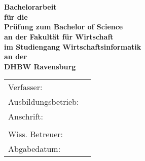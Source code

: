 \begin{titlepage}
	\begin{center}
		\vspace*{2cm}
		\LARGE\bf\myTopic\\
		\Large\rm\mySubTopic\\
		\vspace*{3cm}
		\bf Bachelorarbeit\\
		\normalsize\rm
		\vspace*{0.5cm}\singlespacing
		für die\\
		Prüfung zum Bachelor of Science\\
		\vspace*{0.5cm}\singlespacing
		an der Fakultät für Wirtschaft\\
		im Studiengang Wirtschaftsinformatik\\
		\vspace*{0.5cm}\singlespacing
		an der\\
		DHBW Ravensburg
		\vfill
	\end{center}
	\begin{tabular}{ll}
		Verfasser:&\myAutor\\
		Ausbildungsbetrieb:&\myCompany\\
		Anschrift:&\myCompanyAddressStreet\\
		&\myCompanyAddressCity\\
		Wiss. Betreuer:&\myProf\\
		Abgabedatum:&\myEndDate\\
	\end{tabular}
\end{titlepage}
\newpage
\setcounter{page}{2}
